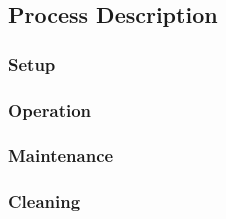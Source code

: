 \subsection{Process Description}
\subsubsection{Setup}
\subsubsection{Operation}
\subsubsection{Maintenance}
\subsubsection{Cleaning}